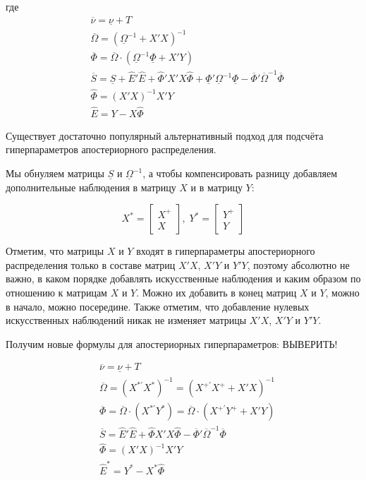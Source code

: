\documentclass[11pt]{article} %
\newcommand{\prior}{\underline}
\newcommand{\post}{\overline}
\begin{document}
где
\begin{align*}
&\post\nu =\prior \nu+T\\
&\post{\Omega}=(\prior \Omega^{-1}+X'X)^{-1}\\
&\post \Phi=\post{\Omega}\cdot (\prior \Omega^{-1}\prior \Phi+X'Y)\\
&\post S=\prior S +\hat E'\hat E+\hat \Phi'
 X'X \hat \Phi +\prior \Phi'\prior\Omega^{-1}\prior \Phi-\post \Phi'\post\Omega^{-1}\post \Phi\\
&\hat\Phi=(X'X)^{-1}X'Y\\%
&\hat E=Y-X\hat\Phi
\end{align*}


Существует достаточно популярный альтернативный подход для подсчёта гиперпараметров апостериорного распределения.


Мы обнуляем матрицы  $\prior S$ и $\prior \Omega^{-1}$, а чтобы компенсировать разницу добавляем дополнительные наблюдения в матрицу $X$ и в матрицу $Y$: 

\[
X^*=\begin{bmatrix}
X^{+} \\
X 
\end{bmatrix}, \;
Y^*=\begin{bmatrix}
Y^{+} \\
Y 
\end{bmatrix}
\]

Отметим, что матрицы $X$ и $Y$ входят в гиперпараметры апостериорного распределения только в составе матриц $X'X$, $X'Y$ и $Y'Y$, поэтому абсолютно не важно, в каком порядке добавлять искусственные наблюдения и каким образом по отношению к матрицам $X$ и $Y$. Можно их добавить в конец матриц $X$ и $Y$, можно в начало, можно посередине. Также отметим, что добавление нулевых искусственных наблюдений никак не изменяет матрицы $X'X$, $X'Y$ и $Y'Y$.

Получим новые формулы для апостериорных гиперпараметров:
ВЫВЕРИТЬ!

\begin{align*}
&\post\nu =\prior \nu+T\\
&\post{\Omega}=(X^{*\prime}X^*)^{-1}=(X^{+\prime}X^+ + X'X)^{-1}\\
&\post \Phi=\post{\Omega}\cdot (X^{*\prime}Y^*)=\post{\Omega}\cdot (X^{+\prime}Y^++X'Y)\\
&\post S=\hat E'\hat E+\hat \Phi X'X \hat \Phi -\post \Phi'\post\Omega^{-1}\post \Phi\\
&\hat\Phi=(X'X)^{-1}X'Y\\%
&\hat E^*=Y^*-X^*\hat\Phi
\end{align*}
\end{document}

